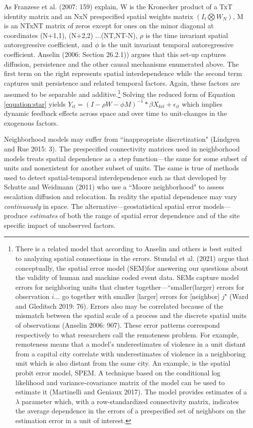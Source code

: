 \documentclass[12pt]{article}
\begin{document}
As Franzese et al. (2007: 159) explain, W is the
Kronecker product of a TxT identity matrix and an NxN prespecified spatial weights matrix
$(I_t \bigotimes W_N)$, M is an NTxNT matrix of zeros except for ones on the minor
diagonal at coordinates (N+1,1), (N+2,2) ...(NT,NT-N), $\rho$ is the time invariant spatial autoregressive coefficient, and $\phi$ is the unit invariant
temporal autoregressive coefficient. Anselin (2006: Section 26.2.1)) argues that this set-up captures
diffusion, persistence and the other causal mechanisms enumerated above. The first term on the right represents
spatial interdependence while the second term captures unit persistence and related
temporal factors. Again, these factors are assumed to be separable and additive.\footnote
{There is a related model that according to Anselin and others is best suited to
analyzing spatial connections in the errors. Stundal et al. (2021) argue that conceptually, the
spatial error model (SEM)for answering our questions about
the validity of human and machine coded event data. SEMs capture model errors for
neighboring units that cluster together---``smaller(larger) errors for observation $i \ldots$
go together with smaller [larger] errors for [neighbor] $j$" (Ward and Gleditsch 2019: 76).
Errors also may be correlated because of the mismatch between the spatial scale of a process
and the discrete spatial units of observations (Anselin 2006: 907). These error patterns
correspond respectively to what researchers call the remoteness problem. For example,
remoteness means that a model's underestimates of violence in a unit distant from a
capital city correlate with underestimates of violence in a neighboring unit which is
also distant from the same city. An example, is the spatial probit error model, SPEM.
A technique based on the conditional log likelihood and variance-covariance matrix of
the model can be used to estimate it (Martinelli and Geniaux 2017). The model provides
estimates of a $\lambda$ parameter which, with a row-standardized connectivity matrix,
indicates the average dependence in the errors of a prespecified set of neighbors on
the estimation error in a unit of interest.} Solving the reduced form of Equation \ref{equation:star} yields $Y_{it} = (I - \rho W - \phi M)^{-1} * \beta X_{kit} + \epsilon_{it}$ which implies dynamic feedback effects across space and over time to unit-changes in the exogenous factors.

Neighborhood models may suffer from ``inappropriate discretization" (Lindgren and Rue 2015: 3).
The prespecified connectivity matrices used in neighborhood models treats spatial dependence
as a step function---the same for some subset of units and nonexistent for another subset of
units. The same is true of methods used to detect spatial-temporal interdependence such as
that developed by Schutte and Weidmann (2011) who use a ``Moore neighborhood" to assess
escalation diffusion and relocation. In reality the spatial dependence may vary \textit{continuously}
in space.  The alternative---geostatistical spatial error models---produce \textit{estimates}
of both the range of spatial error dependence and of the site specific impact of unobserved
factors.
\end{document}
